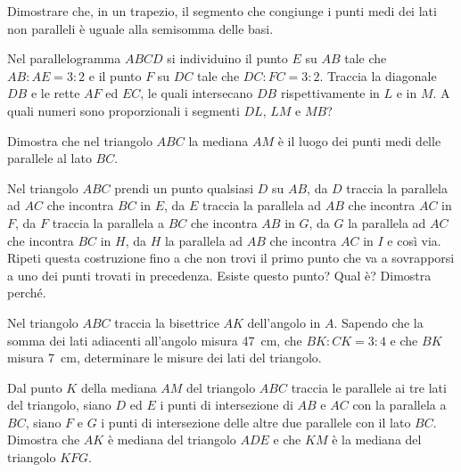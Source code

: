 \begin{multicols}{2}
\begin{esercizio}
\label{ese:6.41}
Dimostrare che, in un trapezio, il segmento che congiunge i punti medi dei lati non paralleli è uguale alla semisomma delle basi.
\end{esercizio}

\begin{esercizio}
\label{ese:6.42}
Nel parallelogramma $ABCD$ si individuino il punto $E$ su $AB$ tale che $AB : AE = 3 : 2$ e il punto $F$ su $DC$ tale che $DC : FC = 3 : 2$. Traccia la diagonale $DB$ e le rette $AF$ ed $EC$, le quali intersecano $DB$ rispettivamente in $L$ e in $M$. A quali numeri sono proporzionali i segmenti $DL$, $LM$ e $MB$?
\end{esercizio}

\begin{esercizio}
\label{ese:6.43}
Dimostra che nel triangolo $ABC$ la mediana $AM$ è il luogo dei punti medi delle parallele al lato $BC$.
\end{esercizio}

\begin{esercizio}
\label{ese:6.44}
Nel triangolo $ABC$ prendi un punto qualsiasi $D$ su $AB$, da $D$ traccia la parallela ad $AC$ che incontra $BC$ in $E$, da $E$ traccia la parallela ad $AB$ che incontra $AC$ in $F$, da $F$ traccia la parallela a $BC$ che incontra $AB$ in $G$, da $G$ la parallela ad $AC$ che incontra $BC$ in $H$, da $H$ la parallela ad $AB$ che incontra $AC$ in $I$ e così via. Ripeti questa costruzione fino a che non trovi il primo punto che va a sovrapporsi a uno dei punti trovati in precedenza. Esiste questo punto? Qual è? Dimostra perché.
\end{esercizio}

\begin{esercizio}
\label{ese:6.45}
Nel triangolo $ABC$ traccia la bisettrice $AK$ dell'angolo in $A$. Sapendo che la somma dei lati adiacenti all'angolo misura 47~cm, che $BK : CK = 3 : 4$ e che $BK$ misura 7~cm, determinare le misure dei lati del triangolo.
\end{esercizio}

\begin{esercizio}
\label{ese:6.46}
Dal punto $K$ della mediana $AM$ del triangolo $ABC$ traccia le parallele ai tre lati del triangolo, siano $D$ ed $E$ i punti di intersezione di $AB$ e $AC$ con la parallela a $BC$, siano $F$ e $G$ i punti di intersezione delle altre due parallele con il lato $BC$. Dimostra che $AK$ è mediana del triangolo $ADE$ e che $KM$ è la mediana del triangolo $KFG$.
\end{esercizio}


\end{multicols}
